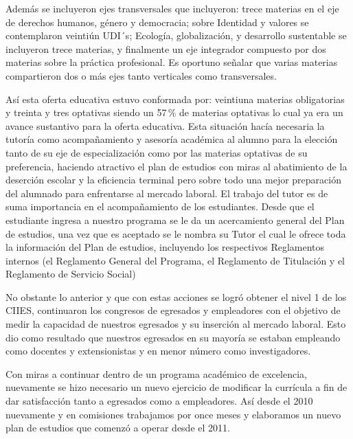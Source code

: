 Además se incluyeron ejes transversales que incluyeron: trece materias 
en el eje de derechos humanos, género y democracia; sobre Identidad y 
valores se contemplaron veintiún UDI´s; Ecología, globalización, y 
desarrollo sustentable se incluyeron trece materias, y finalmente un 
eje integrador compuesto por dos materias sobre la práctica 
profesional. Es oportuno señalar que varias materias compartieron dos o 
más ejes tanto verticales como transversales. 

Así esta oferta educativa estuvo conformada por: veintiuna materias 
obligatorias y treinta y tres optativas siendo un 57\,\% de materias 
optativas lo cual ya era un avance sustantivo para la oferta educativa. 
Esta situación hacía necesaria la tutoría como acompañamiento y 
asesoría académica al alumno para la elección tanto de su eje de 
especialización como por las materias optativas de su preferencia, 
haciendo atractivo el plan de estudios con miras al abatimiento de la 
deserción escolar y la eficiencia terminal pero sobre todo una mejor 
preparación del alumnado para enfrentarse al mercado laboral. El 
trabajo del tutor es de suma importancia en el acompañamiento de los 
estudiantes. Desde que el estudiante ingresa a nuestro programa se le 
da un acercamiento general del Plan de estudios, una vez que es 
aceptado se le nombra su Tutor el cual le ofrece toda la información 
del Plan de estudios, incluyendo los respectivos Reglamentos internos 
(el Reglamento General del Programa, el Reglamento de  Titulación y el 
Reglamento de Servicio Social)


No obstante lo anterior y que con estas acciones se logró obtener el 
nivel 1 de los CIIES, continuaron los congresos de egresados y 
empleadores con el objetivo de medir la capacidad de nuestros egresados 
y su inserción al mercado laboral. Esto dio como resultado que nuestros 
egresados en su mayoría se estaban empleando como docentes y 
extensionistas y en menor número como investigadores.

 
Con miras a continuar dentro de un programa académico de excelencia, 
nuevamente se hizo necesario un nuevo ejercicio de modificar la 
currícula a fin de dar satisfacción tanto a egresados como a 
empleadores. Así desde el 2010 nuevamente y en comisiones trabajamos 
por once meses y elaboramos un nuevo plan de estudios que comenzó a 
operar desde el 2011.

